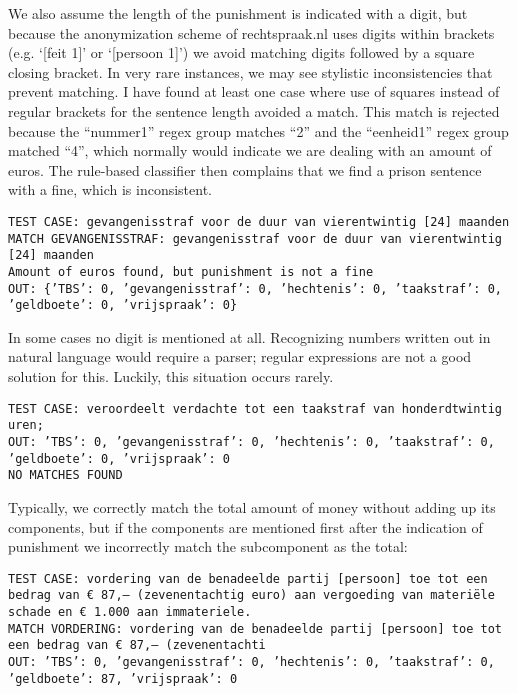 \documentclass[a4paper]{article}
\begin{document}
We also assume the length of the punishment is indicated with a digit, but because the anonymization scheme of rechtspraak.nl uses digits within brackets (e.g. `[feit 1]' or `[persoon 1]') we avoid matching digits followed by a square closing bracket.
In very rare instances, we may see stylistic inconsistencies that prevent matching.
I have found at least one case where use of squares instead of regular brackets for the sentence length avoided a match.
This match is rejected because the ``nummer1'' regex group matches ``2'' and the ``eenheid1'' regex group matched ``4'', which normally would indicate we are dealing with an amount of euros.
The rule-based classifier then complains that we find a prison sentence with a fine, which is inconsistent.

\texttt{TEST CASE: gevangenisstraf voor de duur van vierentwintig [24] maanden
MATCH GEVANGENISSTRAF: gevangenisstraf voor de duur van vierentwintig [24] maanden\\
Amount of euros found, but punishment is not a fine\\
OUT: \{'TBS': 0, 'gevangenisstraf': 0, 'hechtenis': 0, 'taakstraf': 0, 'geldboete': 0, 'vrijspraak': 0\}}


In some cases no digit is mentioned at all.
Recognizing numbers written out in natural language would require a parser; regular expressions are not a good solution for this.
Luckily, this situation occurs rarely.

\texttt{TEST CASE:
veroordeelt verdachte tot een taakstraf van honderdtwintig uren;\\
OUT: {'TBS': 0, 'gevangenisstraf': 0, 'hechtenis': 0, 'taakstraf': 0, 'geldboete': 0, 'vrijspraak': 0}\\
NO MATCHES FOUND
}

Typically, we correctly match the total amount of money without adding up its components, but if the components are mentioned first after the indication of punishment we incorrectly match the subcomponent as the total:

\texttt{TEST CASE: vordering van de benadeelde partij [persoon] toe tot een bedrag van € 87,-- (zevenentachtig euro) aan vergoeding van materiële schade en € 1.000 aan immateriele. \\
MATCH VORDERING: vordering van de benadeelde partij [persoon] toe tot een bedrag van € 87,-- (zevenentachti\\
OUT: {'TBS': 0, 'gevangenisstraf': 0, 'hechtenis': 0, 'taakstraf': 0, 'geldboete': 87, 'vrijspraak': 0}\\
}
\end{document}
